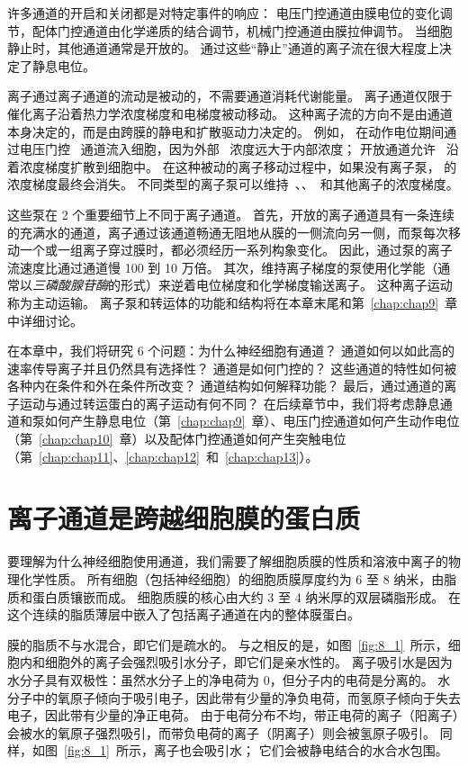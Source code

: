 许多通道的开启和关闭都是对特定事件的响应：
电压门控通道由膜电位的变化调节，配体门控通道由化学递质的结合调节，机械门控通道由膜拉伸调节。
当细胞静止时，其他通道通常是开放的。
通过这些“静止”通道的离子流在很大程度上决定了静息电位。


离子通过离子通道的流动是被动的，不需要通道消耗代谢能量。
离子通道仅限于催化离子沿着热力学浓度梯度和电梯度被动移动。
这种离子流的方向不是由通道本身决定的，而是由跨膜的静电和扩散驱动力决定的。
例如， 在动作电位期间通过电压门控~ 通道流入细胞，因为外部~ 浓度远大于内部浓度；
开放通道允许~ 沿着浓度梯度扩散到细胞中。
在这种被动的离子移动过程中，如果没有离子泵， 的浓度梯度最终会消失。
不同类型的离子泵可以维持~、、~和其他离子的浓度梯度。


这些泵在 2 个重要细节上不同于离子通道。
首先，开放的离子通道具有一条连续的充满水的通道，离子通过该通道畅通无阻地从膜的一侧流向另一侧，而泵每次移动一个或一组离子穿过膜时，都必须经历一系列构象变化。
因此，通过泵的离子流速度比通过通道慢 100 到 10 万倍。
其次，维持离子梯度的泵使用化学能（通常以\textit{三磷酸腺苷酶}的形式）来逆着电位梯度和化学梯度输送离子。
这种离子运动称为主动运输。
离子泵和转运体的功能和结构将在本章末尾和第~\ref{chap:chap9}~章中详细讨论。


在本章中，我们将研究 6 个问题：为什么神经细胞有通道？
通道如何以如此高的速率传导离子并且仍然具有选择性？ 
通道是如何门控的？
这些通道的特性如何被各种内在条件和外在条件所改变？
通道结构如何解释功能？
最后，通过通道的离子运动与通过转运蛋白的离子运动有何不同？
在后续章节中，我们将考虑静息通道和泵如何产生静息电位（第~\ref{chap:chap9}~章）、电压门控通道如何产生动作电位（第~\ref{chap:chap10}~章）以及配体门控通道如何产生突触电位（第~\ref{chap:chap11}、\ref{chap:chap12}~和~\ref{chap:chap13}）。



\section{离子通道是跨越细胞膜的蛋白质}

要理解为什么神经细胞使用通道，我们需要了解细胞质膜的性质和溶液中离子的物理化学性质。
所有细胞（包括神经细胞）的细胞质膜厚度约为 6 至 8 纳米，由脂质和蛋白质镶嵌而成。
细胞质膜的核心由大约 3 至 4 纳米厚的双层磷脂形成。
在这个连续的脂质薄层中嵌入了包括离子通道在内的整体膜蛋白。


膜的脂质不与水混合，即它们是疏水的。
与之相反的是，如图~\ref{fig:8_1}~所示，细胞内和细胞外的离子会强烈吸引水分子，即它们是亲水性的。
离子吸引水是因为水分子具有双极性：虽然水分子上的净电荷为 0，但分子内的电荷是分离的。
水分子中的氧原子倾向于吸引电子，因此带有少量的净负电荷，而氢原子倾向于失去电子，因此带有少量的净正电荷。
由于电荷分布不均，带正电荷的离子（阳离子）会被水的氧原子强烈吸引，而带负电荷的离子（阴离子）则会被氢原子吸引。
同样，如图~\ref{fig:8_1}~所示，离子也会吸引水；
它们会被静电结合的水合水包围。


